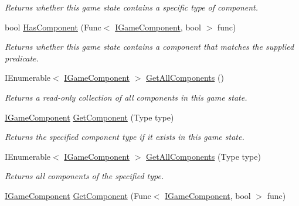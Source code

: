 \begin{DoxyCompactItemize}
\begin{DoxyCompactList}\small\item\em Returns whether this game state contains a specific type of component. \end{DoxyCompactList}\item 
bool \hyperlink{interface_tri_devs_1_1_tri_engine_1_1_state_management_1_1_i_game_state_ac081eb17017e236903df84d626e29a7c}{Has\-Component} (Func$<$ \hyperlink{interface_tri_devs_1_1_tri_engine_1_1_interfaces_1_1_i_game_component}{I\-Game\-Component}, bool $>$ func)
\begin{DoxyCompactList}\small\item\em Returns whether this game state contains a component that matches the supplied predicate. \end{DoxyCompactList}\item 
I\-Enumerable$<$ \hyperlink{interface_tri_devs_1_1_tri_engine_1_1_interfaces_1_1_i_game_component}{I\-Game\-Component} $>$ \hyperlink{interface_tri_devs_1_1_tri_engine_1_1_state_management_1_1_i_game_state_a7ba2b104d899d2ea0ad6dae3a4ff3b26}{Get\-All\-Components} ()
\begin{DoxyCompactList}\small\item\em Returns a read-\/only collection of all components in this game state. \end{DoxyCompactList}\item 
\hyperlink{interface_tri_devs_1_1_tri_engine_1_1_interfaces_1_1_i_game_component}{I\-Game\-Component} \hyperlink{interface_tri_devs_1_1_tri_engine_1_1_state_management_1_1_i_game_state_a3b15e027ea1f65834188eb6e4e7bd61a}{Get\-Component} (Type type)
\begin{DoxyCompactList}\small\item\em Returns the specified component type if it exists in this game state. \end{DoxyCompactList}\item 
I\-Enumerable$<$ \hyperlink{interface_tri_devs_1_1_tri_engine_1_1_interfaces_1_1_i_game_component}{I\-Game\-Component} $>$ \hyperlink{interface_tri_devs_1_1_tri_engine_1_1_state_management_1_1_i_game_state_a610a3d83a19e300df5909afc67cef27d}{Get\-All\-Components} (Type type)
\begin{DoxyCompactList}\small\item\em Returns all components of the specified type. \end{DoxyCompactList}\item 
\hyperlink{interface_tri_devs_1_1_tri_engine_1_1_interfaces_1_1_i_game_component}{I\-Game\-Component} \hyperlink{interface_tri_devs_1_1_tri_engine_1_1_state_management_1_1_i_game_state_aaa69551487d8ac1bfea4e2fd97ef229e}{Get\-Component} (Func$<$ \hyperlink{interface_tri_devs_1_1_tri_engine_1_1_interfaces_1_1_i_game_component}{I\-Game\-Component}, bool $>$ func)

\end{DoxyCompactItemize}
